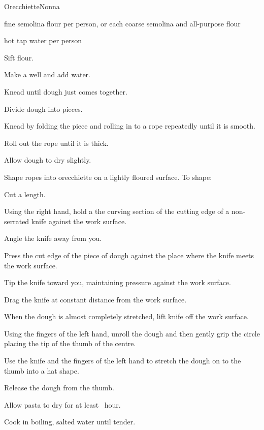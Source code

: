 \begin{recipe}{Orecchiette}{Nonna}{}

\begin{ingredients}
\item {} fine semolina flour per person, or  each coarse semolina and all-purpose flour
\item {} hot tap water per person
\end{ingredients}

\begin{directions}
\item Sift flour.
\item Make a well and add water.
\item Knead until dough just comes together.
\item Divide dough into pieces.
\item Knead by folding the piece and rolling in to a rope repeatedly until it is smooth.
\item Roll out the rope until it is \inch{\half} thick.
\item Allow dough to dry slightly.
\item Shape ropes into orecchiette on a lightly floured surface. To shape:\par
\begin{enumerate*}
\item Cut a \inch{\half} length.
\item Using the right hand, hold a the curving section of the cutting edge of a non-serrated knife against the work surface.
\item Angle the knife away from you.
\item Press the cut edge of the piece of dough against the place where the knife meets the work surface.
\item Tip the knife toward you, maintaining pressure against the work surface.
\item Drag the knife at constant distance from the work surface.
\item When the dough is almost completely stretched, lift knife off the work surface.
\item Using the fingers of the left hand, unroll the dough and then gently grip the circle placing the tip of the thumb of the centre.
\item Use the knife and the fingers of the left hand to stretch the dough on to the thumb into a hat shape.
\item Release the dough from the thumb.
\end{enumerate*}
\item Allow pasta to dry for at least \half{}~hour.
\item Cook in boiling, salted water until tender.
\end{directions}

\end{recipe}
